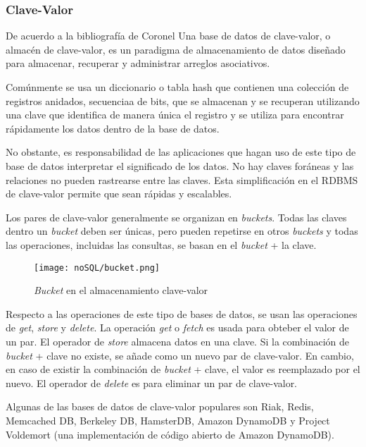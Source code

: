 \subsubsection{Clave-Valor}
De acuerdo a la bibliografía de Coronel\cite{coronel_database_nodate} Una base de datos de clave-valor, o almacén de clave-valor, es un paradigma de almacenamiento de datos diseñado para almacenar, recuperar y administrar arreglos asociativos.


Comúnmente se usa un diccionario o tabla hash que contienen una colección de registros anidados, secuenciaa de bits, que se almacenan y se recuperan utilizando una clave que identifica de manera única el registro y se utiliza para encontrar rápidamente los datos dentro de la base de datos.


No obstante, es responsabilidad de las aplicaciones que hagan uso de este tipo de base de datos interpretar el significado de los datos. No hay claves foráneas y las relaciones no pueden rastrearse entre las claves. Esta simplificación en el RDBMS de clave-valor permite que sean rápidas y escalables.


Los pares de clave-valor generalmente se organizan en \textit{buckets}. Todas las claves dentro un \textit{bucket} deben ser únicas, pero pueden repetirse en otros \textit{buckets} y todas las operaciones, incluidas las consultas, se basan en el \textit{bucket} + la clave.


\begin{figure}[h!t]
    \centering
    \texttt{[image: noSQL/bucket.png]}
    \caption{\textit{Bucket} en el almacenamiento clave-valor}
    \label{img:claveValor-bucket}
\end{figure} 


Respecto a las operaciones de este tipo de bases de datos, se usan las operaciones de \textit{get}, \textit{store} y \textit{delete}. La operación \textit{get} o \textit{fetch} es usada para obteber el valor de un par. El operador de \textit{store} almacena datos en una clave. Si la combinación de \textit{bucket} + clave no existe, se añade como un nuevo par de clave-valor. En cambio, en caso de existir la combinación de \textit{bucket} + clave, el valor es reemplazado por el nuevo. El operador de \textit{delete} es para eliminar un par de clave-valor.


Algunas de las bases de datos de clave-valor populares son Riak, Redis, Memcached DB, Berkeley DB, HamsterDB, Amazon DynamoDB y Project Voldemort (una implementación de código abierto de Amazon DynamoDB)\cite{sadalage_nosql_nodate}.


